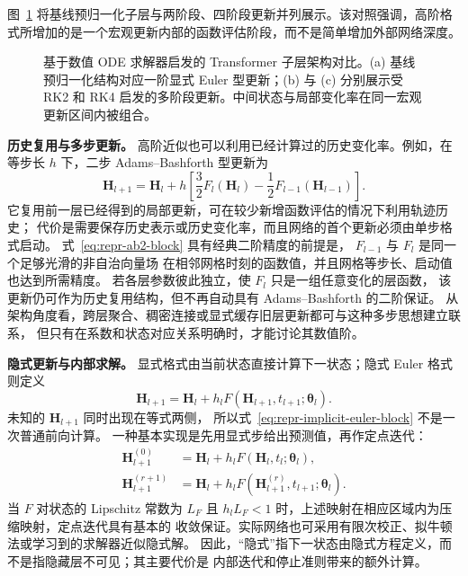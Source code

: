 图~\ref{fig:transformer-rk-blocks} 将基线预归一化子层与两阶段、四阶段更新并列展示。该对照强调，高阶格式所增加的是一个宏观更新内部的函数评估阶段，而不是简单增加外部网络深度。

\begin{figure}[!t]
\centering
{}
\caption{基于数值 ODE 求解器启发的 Transformer 子层架构对比。(a) 基线预归一化结构对应一阶显式 Euler 型更新；(b) 与 (c) 分别展示受 RK2 和 RK4 启发的多阶段更新。中间状态与局部变化率在同一宏观更新区间内被组合。}
\label{fig:transformer-rk-blocks}
\end{figure}

\textbf{历史复用与多步更新。}
高阶近似也可以利用已经计算过的历史变化率。例如，在等步长 \(h\) 下，二步
Adams--Bashforth 型更新为
\begin{equation}
    \boldsymbol{H}_{l+1}
    =
    \boldsymbol{H}_{l}
    +
    h
    \left[
        \frac{3}{2}
        F_l(\boldsymbol{H}_{l})
        -
        \frac{1}{2}
        F_{l-1}(\boldsymbol{H}_{l-1})
    \right].
    \label{eq:repr-ab2-block}
\end{equation}
它复用前一层已经得到的局部更新，可在较少新增函数评估的情况下利用轨迹历史；
代价是需要保存历史表示或历史变化率，而且网络的首个更新必须由单步格式启动。
式~\eqref{eq:repr-ab2-block} 具有经典二阶精度的前提是，
\(F_{l-1}\) 与 \(F_l\) 是同一个足够光滑的非自治向量场
在相邻网格时刻的函数值，并且网格等步长、启动值也达到所需精度。
若各层参数彼此独立，使 \(F_l\) 只是一组任意变化的层函数，
该更新仍可作为历史复用结构，但不再自动具有 Adams--Bashforth 的二阶保证。
从架构角度看，跨层聚合、稠密连接或显式缓存旧层更新都可与这种多步思想建立联系，
但只有在系数和状态对应关系明确时，才能讨论其数值阶。

\textbf{隐式更新与内部求解。}
显式格式由当前状态直接计算下一状态；隐式 Euler 格式则定义
\begin{equation}
    \boldsymbol{H}_{l+1}
    =
    \boldsymbol{H}_{l}
    +
    h_l
    F\!\left(
        \boldsymbol{H}_{l+1},t_{l+1};
        \boldsymbol{\theta}_{l}
    \right).
    \label{eq:repr-implicit-euler-block}
\end{equation}
未知的 \(\boldsymbol{H}_{l+1}\) 同时出现在等式两侧，
所以式~\eqref{eq:repr-implicit-euler-block} 不是一次普通前向计算。
一种基本实现是先用显式步给出预测值，再作定点迭代：
\begin{align}
    \boldsymbol{H}_{l+1}^{(0)}
    &=
    \boldsymbol{H}_{l}
    +
    h_l
    F(\boldsymbol{H}_{l},t_l;\boldsymbol{\theta}_{l}),
    \nonumber\\
    \boldsymbol{H}_{l+1}^{(r+1)}
    &=
    \boldsymbol{H}_{l}
    +
    h_l
    F\!\left(
        \boldsymbol{H}_{l+1}^{(r)},t_{l+1};
        \boldsymbol{\theta}_{l}
    \right).
    \label{eq:repr-fixed-point-block}
\end{align}
当 \(F\) 对状态的 Lipschitz 常数为 \(L_F\) 且
\(h_lL_F<1\) 时，上述映射在相应区域内为压缩映射，定点迭代具有基本的
收敛保证。实际网络也可采用有限次校正、拟牛顿法或学习到的求解器近似隐式解。
因此，“隐式”指下一状态由隐式方程定义，而不是指隐藏层不可见；其主要代价是
内部迭代和停止准则带来的额外计算。

